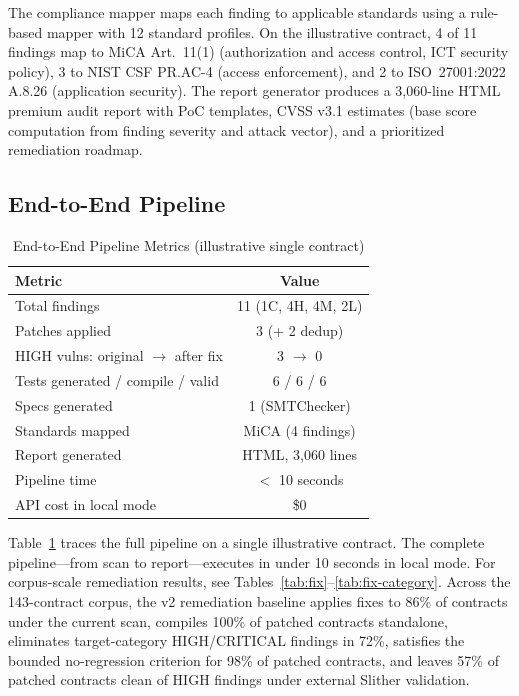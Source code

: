\documentclass[conference]{IEEEtran}
\begin{document}
The compliance mapper maps each finding to applicable standards using a rule-based mapper with 12 standard profiles. On the illustrative contract, 4 of 11 findings map to MiCA Art.~11(1) (authorization and access control, ICT security policy), 3 to NIST CSF PR.AC-4 (access enforcement), and 2 to ISO~27001:2022 A.8.26 (application security). The report generator produces a 3{,}060-line HTML premium audit report with PoC templates, CVSS v3.1 estimates (base score computation from finding severity and attack vector), and a prioritized remediation roadmap.

\subsection{End-to-End Pipeline}

\begin{table}[htbp]
\caption{End-to-End Pipeline Metrics (illustrative single contract)}
\label{tab:e2e}
\centering
\begin{tabular}{@{}lc@{}}
\toprule
\textbf{Metric} & \textbf{Value} \\
\midrule
Total findings & 11 (1C, 4H, 4M, 2L) \\
Patches applied & 3 (+ 2 dedup) \\
HIGH vulns: original $\rightarrow$ after fix & 3 $\rightarrow$ 0 \\
Tests generated / compile / valid & 6 / 6 / 6 \\
Specs generated & 1 (SMTChecker) \\
Standards mapped & MiCA (4 findings) \\
Report generated & HTML, 3{,}060 lines \\
Pipeline time & $<$ 10 seconds \\
API cost in local mode & \$0 \\
\bottomrule
\end{tabular}
\end{table}

Table~\ref{tab:e2e} traces the full pipeline on a single illustrative contract. The complete pipeline---from scan to report---executes in under 10 seconds in local mode. For corpus-scale remediation results, see Tables~\ref{tab:fix}--\ref{tab:fix-category}. Across the 143-contract corpus, the v2 remediation baseline applies fixes to 86\% of contracts under the current scan, compiles 100\% of patched contracts standalone, eliminates target-category HIGH/CRITICAL findings in 72\%, satisfies the bounded no-regression criterion for 98\% of patched contracts, and leaves 57\% of patched contracts clean of HIGH findings under external Slither validation.
\end{document}
